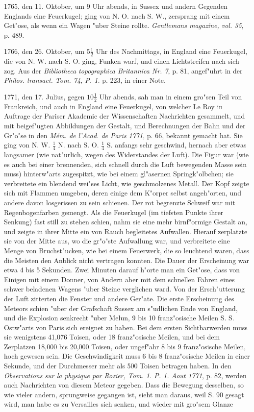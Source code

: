 \documentclass[a4paper, 11pt, oneside, polutonikogreek, german]{article}
\begin{document}
1765, den 11. Oktober, um 9 Uhr abends, in Sussex und andern Gegenden Englands eine Feuerkugel; ging von N. O. nach S. W., zersprang mit einem Get"ose, als wenn ein Wagen "uber Steine rollte. \emph{Gentlemans magazine, vol. 35}, p. 489.

1766, den 26. Oktober, um $\mathfrak{5\frac{1}{2}}$ Uhr des Nachmittags, in England eine Feuerkugel, die von N. W. nach S. O. ging, Funken warf, und einen Lichtstreifen nach sich zog. Aus der \emph{Bibliotheca topographica Britannica Nr. 7}, p. 81, angef"uhrt in der \emph{Philos. transact. Tom. 74, P. 1.} p. 223, in einer Note.

1771, den 17. Julius, gegen $\mathfrak{10\frac{1}{2}}$ Uhr abends, sah man in einem gro"sen Teil von Frankreich, und auch in England eine Feuerkugel, von welcher Le Roy in Auftrage der Pariser Akademie der Wissenschaften Nachrichten gesammelt, und mit beigef"ugten Abbildungen der Gestalt, und Berechnungen der Bahn und der Gr"o"se in den \emph{Mém. de l'Acad. de Paris 1771}, p. 66, bekannt gemacht hat. Sie ging von N. W. $\mathfrak{\frac{1}{4}}$ N. nach S. O. $\mathfrak{\frac{1}{4}}$ S. anfangs sehr geschwind, hernach aber etwas langsamer (wie nat"urlich, wegen des Widerstandes der Luft). Die Figur war (wie es auch bei einer brennenden, sich schnell durch die Luft bewegenden Masse sein muss) hinterw"arts zugespitzt, wie bei einem gl"asernen Springk"olbchen; sie verbreitete ein blendend wei"ses Licht, wie geschmolzenes Metall. Der Kopf zeigte sich mit Flammen umgeben, deren einige dem K"orper selbst angeh"orten, und andere davon losgerissen zu sein schienen. Der rot begrenzte Schweif war mit Regenbogenfarben gemengt. Als die Feuerkugel (im tiefsten Punkte ihrer Senkung) fast still zu stehen schien, nahm sie eine mehr birnf"ormige Gestalt an, und zeigte in ihrer Mitte ein von Rauch begleitetes Aufwallen. Hierauf zerplatzte sie von der Mitte aus, wo die gr"o"ste Aufwallung war, und verbreitete eine Menge von Bruchst"ucken, wie bei einem Feuerwerk, die so leuchtend waren, dass die Meisten den Anblick nicht vertragen konnten. Die Dauer der Erscheinung war etwa 4 bis 5 Sekunden. Zwei Minuten darauf h"orte man ein Get"ose, dass von Einigen mit einem Donner, von Andern aber mit dem schnellen Fahren eines schwer beladenen Wagens "uber Steine verglichen ward. Von der Ersch"utterung der Luft zitterten die Fenster und andere Ger"ate. Die erste Erscheinung des Meteors schien "uber der Grafschaft Sussex am s"udlichen Ende von England, und die Explosion senkrecht "uber Melun, 9 bis 10 franz"osische Meilen S. S. Ostw"arts von Paris sich ereignet zu haben. Bei dem ersten Sichtbarwerden muss sie wenigstens 41,076 Toisen, oder 18 franz"osische Meilen, und bei dem Zerplatzen 18,000 bis 20,000 Toisen, oder ungef"ahr 8 bis 9 franz"osische Meilen, hoch gewesen sein. Die Geschwindigkeit muss 6 bis 8 franz"osische Meilen in einer Sekunde, und der Durchmesser mehr als 500 Toisen betragen haben. In den \emph{Observations sur la physique par Rozier, Tom. 1. P. 1. Aout 1771}, p. 82, werden auch Nachrichten von diesem Meteor gegeben. Dass die Bewegung desselben, so wie vieler andern, sprungweise gegangen ist, sieht man daraus, weil S. 90 gesagt wird, man habe es zu Versailles sich senken, und wieder mit gro"sem Glanze 
\end{document}
